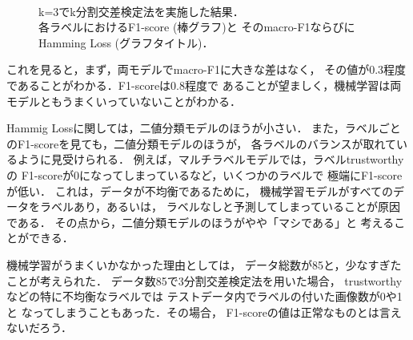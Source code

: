 \begin{figure}[p]
  \centering
  \\
  \caption{ k=3でk分割交差検定法を実施した結果．\\
    各ラベルにおけるF1-score (棒グラフ)と
  そのmacro-F1ならびにHamming Loss (グラフタイトル)．
 }
  \label{fig:ch2:result}
\end{figure}

これを見ると，まず，両モデルでmacro-F1に大きな差はなく，
その値が0.3程度であることがわかる．F1-scoreは0.8程度で
あることが望ましく，機械学習は両モデルともうまくいっていないことがわかる．

Hammig Lossに関しては，二値分類モデルのほうが小さい．
また，ラベルごとのF1-scoreを見ても，二値分類モデルのほうが，
各ラベルのバランスが取れているように見受けられる．
例えば，マルチラベルモデルでは，ラベルtrustworthyの
F1-scoreが0になってしまっているなど，いくつかのラベルで
極端にF1-scoreが低い．
これは，データが不均衡であるために，
機械学習モデルがすべてのデータをラベルあり，あるいは，
ラベルなしと予測してしまっていることが原因である．
その点から，二値分類モデルのほうがやや「マシである」と
考えることができる．

機械学習がうまくいかなかった理由としては，
データ総数が85と，少なすぎたことが考えられた．
データ数85で3分割交差検定法を用いた場合，
trustworthyなどの特に不均衡なラベルでは
テストデータ内でラベルの付いた画像数が0や1と
なってしまうこともあった．その場合，
F1-scoreの値は正常なものとは言えないだろう．

